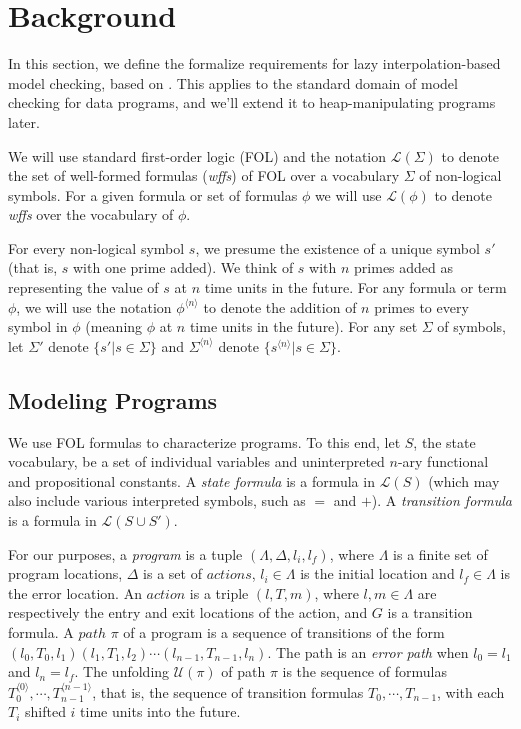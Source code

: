 \section{Background}
\label{sec:background}

In this section, we define the formalize requirements for lazy interpolation-based model checking, based on \cite{mcmillan06}. This applies to the standard domain of model checking for data programs, and we'll extend it to heap-manipulating programs later.

We will use standard first-order logic (FOL) and the notation $\mathcal{L}(\Sigma)$ to denote the set of well-formed formulas (\textit{wffs}) of FOL over a vocabulary $\Sigma$ of non-logical symbols. For a given formula or set of formulas $\phi$ we will use $\mathcal{L}(\phi)$ to denote \textit{wffs} over the vocabulary of $\phi$.

For every non-logical symbol $s$, we presume the existence of a unique symbol $s'$ (that is, $s$ with one prime added). We think of $s$ with $n$ primes added as representing the value of $s$ at $n$ time units in the future. For any formula or term $\phi$, we will use the notation $\phi^{\langle n \rangle}$ to denote the addition of $n$ primes to every symbol in $\phi$ (meaning $\phi$ at $n$ time units in the future). For any set $\Sigma$ of symbols, let $\Sigma'$ denote $\{ s' | s \in \Sigma \}$ and $\Sigma^{\langle n \rangle}$ denote $\{ s^{\langle n \rangle} | s \in \Sigma \}$.

\subsection{Modeling Programs}
\label{sec:modeling-programs}

We use FOL formulas to characterize programs. To this end, let $S$, the state vocabulary, be a set of individual variables and uninterpreted $n$-ary functional and propositional constants. A \textit{state formula} is a formula in $\mathcal{L}(S)$ (which may also include various interpreted symbols, such as $=$ and $+$). A \textit{transition formula} is a formula in $\mathcal{L}(S \cup S')$.

For our purposes, a \textit{program} is a tuple $(\Lambda, \Delta, l_i, l_f)$, where $\Lambda$ is a finite set of program locations, $\Delta$ is a set of $actions$, $l_i \in \Lambda$ is the initial location and $l_f \in \Lambda$ is the error location. An $action$ is a triple $(l, T, m)$, where $l,m \in \Lambda$ are respectively the entry and exit locations of the action, and $G$ is a transition formula. A $path$ $\pi$ of a program is a sequence of transitions of the form $(l_0, T_0, l_1)(l_1, T_1, l_2) \cdots (l_{n-1}, T_{n-1}, l_n)$. The path is an \textit{error path} when $l_0 = l_1$ and $l_n = l_f$. The unfolding $\mathcal{U}(\pi)$ of path $\pi$ is the sequence of formulas $T_0^{\langle 0 \rangle}, \cdots, T_{n-1}^{\langle n-1 \rangle}$, that is, the sequence of transition formulas $T_0, \cdots, T_{n-1}$, with each $T_i$ shifted $i$ time units into the future.

